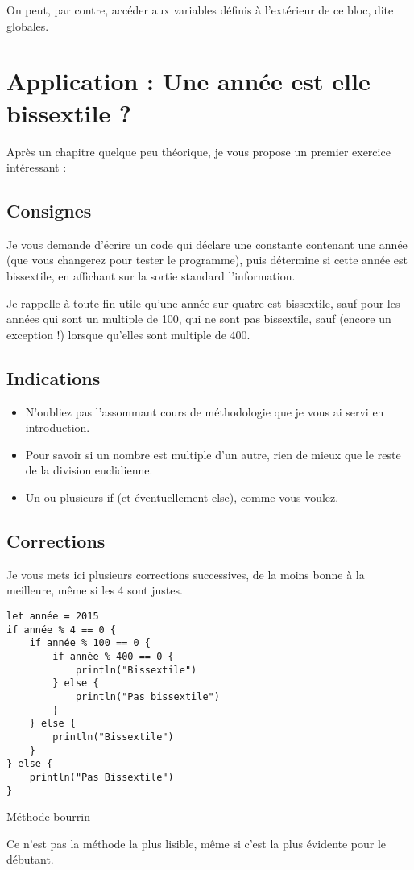 On peut, par contre, accéder aux variables définis à l'extérieur de ce bloc, dite globales.
\section{Application : Une année est elle bissextile ?}
Après un chapitre quelque peu théorique, je vous propose un premier exercice intéressant :
\subsection{Consignes}
Je vous demande d'écrire un code qui déclare une constante contenant une année
(que vous changerez pour tester le programme),
puis détermine si cette année est bissextile,
en affichant sur la sortie standard l'information.

Je rappelle à toute fin utile qu'une année sur quatre est bissextile,
sauf pour les années qui sont un multiple de 100, qui ne sont pas bissextile,
sauf (encore un exception !) lorsque qu'elles sont multiple de 400.
\subsection{Indications}
\begin{itemize}

\item N'oubliez pas l'assommant cours de méthodologie que je vous ai servi en introduction.

\item Pour savoir si un nombre est multiple d'un autre,
rien de mieux que le reste de la division euclidienne.

\item Un ou plusieurs if (et éventuellement else), comme vous voulez.
\end{itemize}
\pagebreak %
\subsection{Corrections}
Je vous mets ici plusieurs corrections successives,
de la moins bonne à la meilleure, même si les 4 sont justes.

\begin{listing}[h!]
\begin{verbatim}
let année = 2015
if année % 4 == 0 {
    if année % 100 == 0 {
        if année % 400 == 0 {
            println("Bissextile")
        } else {
            println("Pas bissextile")
        }
    } else {
        println("Bissextile")
    }
} else {
    println("Pas Bissextile")
}
\end{verbatim}
\caption{Méthode bourrin}
\end{listing}
Ce n'est pas la méthode la plus lisible,
même si c'est la plus évidente pour le débutant.

